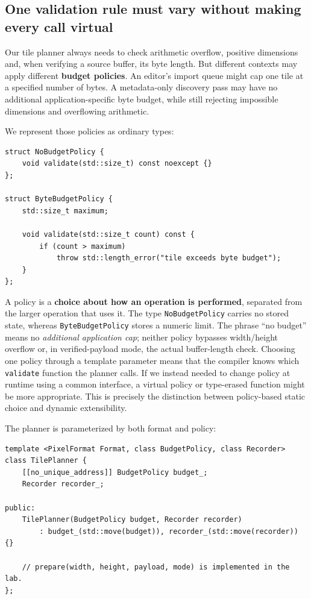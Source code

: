 \subsection{One validation rule must vary without making every call virtual}\label{01-foundations-i-ch005-one-validation-rule-must-vary-without-making-every-call-virtual}

Our tile planner always needs to check arithmetic overflow, positive dimensions and, when verifying a source buffer, its byte length. But different contexts may apply different \textbf{budget policies}. An editor's import queue might cap one tile at a specified number of bytes. A metadata-only discovery pass may have no additional application-specific byte budget, while still rejecting impossible dimensions and overflowing arithmetic.

We represent those policies as ordinary types:

\begin{verbatim}
struct NoBudgetPolicy {
    void validate(std::size_t) const noexcept {}
};

struct ByteBudgetPolicy {
    std::size_t maximum;

    void validate(std::size_t count) const {
        if (count > maximum)
            throw std::length_error("tile exceeds byte budget");
    }
};
\end{verbatim}

A policy is a \textbf{choice about how an operation is performed}, separated from the larger operation that uses it. The type \texttt{NoBudgetPolicy} carries no stored state, whereas \texttt{ByteBudgetPolicy} stores a numeric limit. The phrase ``no budget'' means no \emph{additional application cap}; neither policy bypasses width/height overflow or, in verified-payload mode, the actual buffer-length check. Choosing one policy through a template parameter means that the compiler knows which \texttt{validate} function the planner calls. If we instead needed to change policy at runtime using a common interface, a virtual policy or type-erased function might be more appropriate. This is precisely the distinction between policy-based static choice and dynamic extensibility.

The planner is parameterized by both format and policy:

\begin{verbatim}
template <PixelFormat Format, class BudgetPolicy, class Recorder>
class TilePlanner {
    [[no_unique_address]] BudgetPolicy budget_;
    Recorder recorder_;

public:
    TilePlanner(BudgetPolicy budget, Recorder recorder)
        : budget_(std::move(budget)), recorder_(std::move(recorder)) {}

    // prepare(width, height, payload, mode) is implemented in the lab.
};
\end{verbatim}

